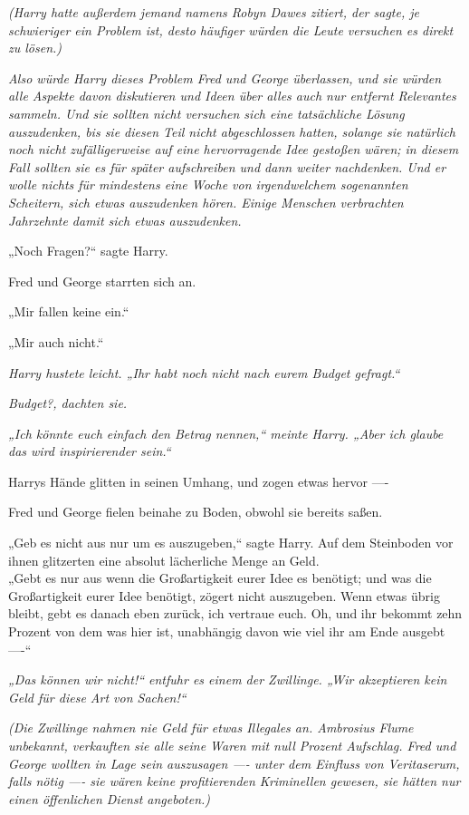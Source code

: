 {\emph{(Harry hatte außerdem jemand namens Robyn Dawes zitiert, der sagte, je schwieriger ein Problem ist, desto häufiger würden die Leute versuchen es direkt zu lösen.)}

\emph{Also würde Harry dieses Problem Fred und George überlassen, und sie würden alle Aspekte davon diskutieren und Ideen über alles auch nur entfernt Relevantes sammeln. Und sie sollten nicht versuchen sich eine tatsächliche Lösung auszudenken, bis sie diesen Teil nicht abgeschlossen hatten, solange sie natürlich noch nicht zufälligerweise auf eine hervorragende Idee gestoßen wären; in diesem Fall sollten sie es für später aufschreiben und dann weiter nachdenken. Und er wolle nichts für mindestens eine Woche von irgendwelchem sogenannten Scheitern, sich etwas auszudenken hören. Einige Menschen verbrachten Jahrzehnte damit sich etwas auszudenken.}

„Noch Fragen?“ sagte Harry.

Fred und George starrten sich an.

„Mir fallen keine ein.“

„Mir auch nicht.“

\emph{Harry hustete leicht. „Ihr habt noch nicht nach eurem Budget gefragt.“}

\emph{Budget?, dachten sie.}

\emph{„Ich könnte euch einfach den Betrag nennen,“ meinte Harry. „Aber ich glaube das wird inspirierender sein.“}

Harrys Hände glitten in seinen Umhang, und zogen etwas hervor ----

Fred und George fielen beinahe zu Boden, obwohl sie bereits saßen.

„Geb es nicht aus nur um es auszugeben,“ sagte Harry. Auf dem Steinboden vor ihnen glitzerten eine absolut lächerliche Menge an Geld.\\ „Gebt es nur aus wenn die Großartigkeit eurer Idee es benötigt; und was die Großartigkeit eurer Idee benötigt, zögert nicht auszugeben. Wenn etwas übrig bleibt, gebt es danach eben zurück, ich vertraue euch. Oh, und ihr bekommt zehn Prozent von dem was hier ist, unabhängig davon wie viel ihr am Ende ausgebt ----“

\emph{„Das können wir nicht!“ entfuhr es einem der Zwillinge. „Wir akzeptieren kein Geld für diese Art von Sachen!“}

\emph{(Die Zwillinge nahmen nie Geld für etwas Illegales an. Ambrosius Flume unbekannt, verkauften sie alle seine Waren mit null Prozent Aufschlag. Fred und George wollten in Lage sein auszusagen ---- unter dem Einfluss von Veritaserum, falls nötig ---- sie wären keine profitierenden Kriminellen gewesen, sie hätten nur einen öffenlichen Dienst angeboten.)}

}
